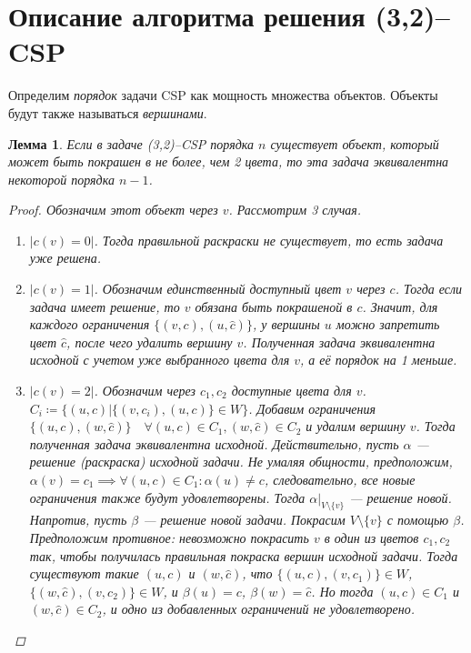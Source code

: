 \documentclass[fleqn]{article}
\theoremstyle{plain}
\theoremstyle{plain}
\theoremstyle{plain}
\newtheorem{lemma}{Лемма}
\theoremstyle{definition}
\begin{document}
\section{Описание алгоритма решения (3,2)--CSP}
Определим \emph{порядок} задачи CSP как мощность множества объектов. Объекты будут также называться \emph{вершинами}.
\begin{lemma}
	Если в задаче (3,2)--CSP порядка $n$ существует объект, который может быть покрашен в не более, чем 2 цвета, то эта задача эквивалентна некоторой порядка $n-1$.
	\begin{proof}
		Обозначим этот объект через $v$. Рассмотрим 3 случая.
		\begin{enumerate}
			\item $|c(v) = 0|$. Тогда правильной раскраски не существует, то есть задача уже решена.
			\item $|c(v) = 1|$. Обозначим единственный доступный цвет $v$ через $c$. Тогда если задача имеет решение, то $v$ обязана быть покрашеной в $c$. Значит, для каждого ограничения $\{(v, c), (u, \widehat{c})\}$, у вершины $u$ можно запретить цвет $\widehat{c}$, после чего удалить вершину $v$. Полученная задача эквивалентна исходной с учетом уже выбранного цвета для $v$, а её порядок на 1 меньше.
			\item $|c(v) = 2|$. Обозначим через $c_1, c_2$ доступные цвета для $v$. $C_i \coloneqq \{(u, c) | \{(v, c_i), (u, c)\} \in W\}$. Добавим ограничения 
$\{(u, c), (w, \widehat{c})\} \quad \forall (u,c) \in C_1, (w,\widehat{c}) \in C_2$ и удалим вершину $v$. Тогда полученная задача эквивалентна исходной. Действительно, пусть $\alpha$ --- решение (раскраска) исходной задачи. Не умаляя общности, предположим, $\alpha(v) = c_1 \implies \forall (u, c) \in C_1 : \alpha(u) \not= c$, следовательно, все новые ограничения также будут удовлетворены. Тогда $\alpha|_{V \setminus \{v\}}$ --- решение новой. Напротив, пусть $\beta$ --- решение новой задачи. Покрасим $V \setminus \{v\}$ с помощью $\beta$. Предположим противное: невозможно покрасить $v$ в один из цветов $c_1, c_2$ так, чтобы получилась правильная покраска вершин исходной задачи. Тогда существуют такие $(u, c)$ и $(w, \widehat{c})$, что $\{(u,c), (v, c_1)\} \in W$, $\{(w, \widehat{c}), (v, c_2)\} \in W$, и $\beta(u) = c$, $\beta(w) = \widehat{c}$. Но тогда $(u,c) \in C_1$ и $(w, \widehat{c}) \in C_2$, и одно из добавленных ограничений не удовлетворено.
		\end{enumerate}
	\end{proof}
\end{lemma}
\end{document}
